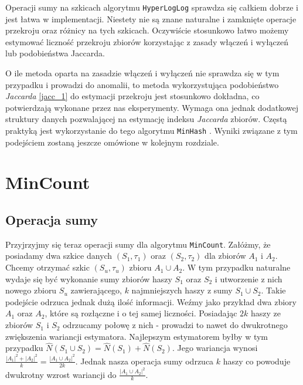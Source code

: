 Operacji sumy na szkicach algorytmu \texttt{HyperLogLog} sprawdza się całkiem dobrze i jest  łatwa w implementacji. Niestety nie są znane naturalne i zamknięte operacje przekroju oraz różnicy na tych szkicach. Oczywiście stosunkowo łatwo możemy estymować liczność przekroju zbiorów korzystając z zasady włączeń i wyłączeń lub podobieństwa Jaccarda.

O ile metoda oparta na zasadzie włączeń i wyłączeń nie sprawdza się w tym przypadku i prowadzi do anomalii, to metoda wykorzystująca podobieństwo \textit{Jaccarda} \ref{jacc_1} do estymacji przekroju jest stosunkowo dokładna, co potwierdzają wykonane przez nas eksperymenty. Wymaga ona jednak dodatkowej struktury danych pozwalającej na estymację indeksu \textit{Jaccarda} zbiorów. Częstą praktyką jest wykorzystanie do tego algorytmu \texttt{MinHash} \cite{adroll}. Wyniki związane z tym podejściem zostaną jeszcze omówione w kolejnym rozdziale.


\section{MinCount}

\subsection{Operacja sumy}

Przyjrzyjmy się teraz operacji sumy dla algorytmu \texttt{MinCount}. Załóżmy, że posiadamy dwa szkice danych $(S_1, {\tau}_1)$ oraz $(S_2, {\tau}_2)$ dla zbiorów $A_1$ i $A_2$. Chcemy otrzymać szkic $(S_u, {\tau}_u)$ zbioru $A_1 \cup A_2$. W tym przypadku naturalne wydaje się być wykonanie sumy zbiorów haszy $S_1$ oraz $S_2$ i utworzenie z nich nowego zbioru $S_u$ zawierającego, $k$ najmniejszych haszy z sumy $S_1 \cup S_2$. Takie podejście  odrzuca jednak dużą ilość informacji. Weźmy jako przykład dwa zbiory $A_1$ oraz $A_2$, które są rozłączne i o tej samej liczności.
Posiadając $2k$ haszy ze zbiorów $S_1$ i $S_2$ odrzucamy połowę z nich - prowadzi to nawet do dwukrotnego zwiększenia wariancji estymatora. 
 Najlepszym estymatorem byłby w tym przypadku $\hat{N}(S_1 \cup S_2) = \hat{N}(S_1) + \hat{N}(S_2)$. Jego wariancja wynosi $\frac{|A_1|^2 + |A_2|^2}{k} = \frac{|A_1 \cup A_2|^2}{2k}$. Jednak nasza operacja sumy odrzuca $k$ haszy co powoduje dwukrotny wzrost wariancji do $\frac{|A_1 \cup A_2|^2}{k}$.

